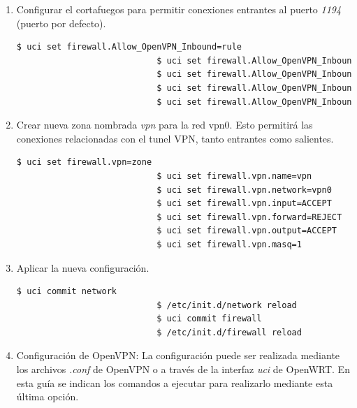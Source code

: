 \documentclass[12pt]{article}
\begin{document}
\begin{enumerate}
\begin{enumerate}
                        \item Configurar el cortafuegos para permitir conexiones entrantes al puerto \textit{1194} (puerto por defecto).

                        \begin{lstlisting}[language=bash]
                            $ uci set firewall.Allow_OpenVPN_Inbound=rule
                            $ uci set firewall.Allow_OpenVPN_Inbound.target=ACCEPT
                            $ uci set firewall.Allow_OpenVPN_Inbound.src=*
                            $ uci set firewall.Allow_OpenVPN_Inbound.proto=udp
                            $ uci set firewall.Allow_OpenVPN_Inbound.dest_port=1194    
                        \end{lstlisting}

                        \item Crear nueva zona nombrada \textit{vpn} para la red vpn0. Esto permitirá las conexiones relacionadas con el tunel VPN, tanto entrantes como salientes.

                        \begin{lstlisting}[language=bash]
                            $ uci set firewall.vpn=zone
                            $ uci set firewall.vpn.name=vpn
                            $ uci set firewall.vpn.network=vpn0
                            $ uci set firewall.vpn.input=ACCEPT
                            $ uci set firewall.vpn.forward=REJECT
                            $ uci set firewall.vpn.output=ACCEPT
                            $ uci set firewall.vpn.masq=1
                        \end{lstlisting}

                        \item Aplicar la nueva configuración.

                        \begin{lstlisting}[language=bash]
                            $ uci commit network
                            $ /etc/init.d/network reload
                            $ uci commit firewall
                            $ /etc/init.d/firewall reload  
                        \end{lstlisting}

                        \item Configuración de OpenVPN:
                        La configuración puede ser realizada mediante los archivos \textit{.conf} de OpenVPN o a través de la interfaz \textit{uci} de OpenWRT. En esta guía se indican los comandos a ejecutar para realizarlo mediante esta última opción.


\end{enumerate}
\end{enumerate}
\end{document}
